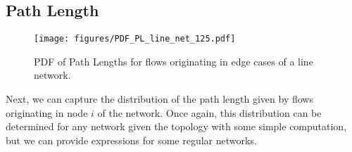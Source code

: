 \subsection{Path Length}

\begin{figure}
\begin{centering}
    \texttt{[image: figures/PDF\_PL\_line\_net\_125.pdf]}
    \caption{PDF of Path Lengths for flows originating in edge cases of a line network.}
    \label{fig:PL_PDFs_line_net}
\end{centering}
\end{figure}

Next, we can capture the distribution of the path length given by flows originating in node $i$ of the network.  Once again, this distribution can be determined for any network given the topology with some simple computation, but we can provide expressions for some regular networks.




